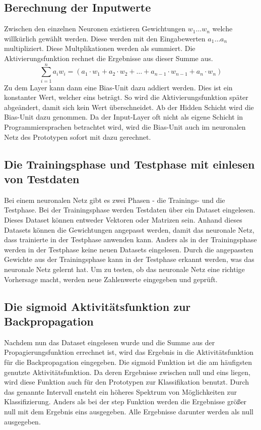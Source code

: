 \subsection{Berechnung der Inputwerte}
Zwischen den einzelnen Neuronen existieren Gewichtungen  \(w_1 \dots w_n\) welche willkürlich gewählt werden. Diese werden mit den Eingabewerten  \(a_1 \dots a_n\) multipliziert. Diese Multplikationen werden als summiert. Die Aktivierungsfunktion rechnet die Ergebnisse aus dieser Summe aus.
\newline
\[\displaystyle\sum_{i=1}^{n} a_i w_i = (a_1 \cdot w_1 + a_2 \cdot w_2 + \dots + a_{n-1} \cdot w_{n-1} + a_n \cdot w_n)\]
\newline
Zu dem Layer kann dann eine Bias-Unit dazu addiert werden. Dies ist ein konstanter Wert, welcher eins beträgt. So wird die Aktivierungsfunktion später abgeändert, damit sich kein Wert überschneidet.
\newline
Ab der Hidden Schicht wird die Bias-Unit dazu genommen. Da der Input-Layer oft nicht als eigene Schicht in Programmiersprachen betrachtet wird, wird die Bias-Unit auch im neuronalen Netz des Prototypen sofort mit dazu gerechnet.

\subsection{Die Trainingsphase und Testphase mit einlesen von Testdaten}
Bei einem neuronalen Netz gibt es zwei Phasen - die Trainings- und die Testphase. Bei der Trainingsphase werden Testdaten über ein Dataset eingelesen. Dieses Dataset können entweder Vektoren oder Matrizen sein. Anhand dieses Datasets können die Gewichtungen angepasst werden, damit das neuronale Netz, dass trainierte in der Testphase anwenden kann.
\newline
Anders als in der Trainingsphase werden in der Testphase keine neuen Datasets eingelesen. Durch die angepassten Gewichte aus der Trainingsphase kann in der Testphase erkannt werden, was das neuronale Netz gelernt hat. Um zu testen, ob das neuronale Netz eine richtige Vorhersage macht, werden neue Zahlenwerte eingegeben und geprüft.

\subsection{Die sigmoid Aktivitätsfunktion zur Backpropagation}
\label{sec:inp}
Nachdem nun das Dataset eingelesen wurde und die Summe aus der Propagierungsfunktion errechnet ist, wird das Ergebnis in die Aktivitätsfunktion für die Backpropagation eingegeben. Die sigmoid Funktion ist die am häufigsten genutzte Aktivitätsfunktion. Da deren Ergebnisse zwischen null und eins liegen, wird diese Funktion auch für den Prototypen zur Klassifikation benutzt. \citep{Rey2011} Durch das genannte Intervall ensteht ein höheres Spektrum von Möglichkeiten zur Klassifizierung. Anders als bei der step Funktion werden die Ergebnisse größer null mit dem Ergebnis eins ausgegeben. Alle Ergebnisse darunter werden als null ausgegeben.

